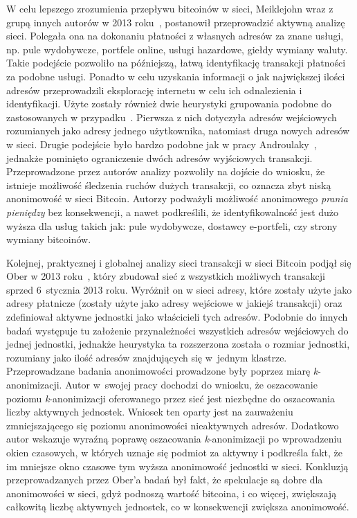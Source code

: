 \documentclass[12pt, oneside, final, openany]{mgr}
\begin{document}
\indent W celu lepszego zrozumienia przepływu bitcoinów w sieci, Meiklejohn wraz z grupą innych autorów w 2013 roku~\cite{meiklejohn2013fistful}, postanowił  przeprowadzić aktywną analizę sieci. Polegała ona na dokonaniu płatności z własnych adresów za znane usługi, np. pule wydobywcze, portfele online, usługi hazardowe, giełdy wymiany waluty. Takie podejście pozwoliło na późniejszą, łatwą identyfikację transakcji płatności za podobne usługi. Ponadto w celu uzyskania informacji o jak największej ilości adresów przeprowadzili eksplorację internetu w celu ich odnalezienia i identyfikacji. Użyte zostały również dwie heurystyki grupowania podobne do zastosowanych w przypadku~\cite{Reid2013, Androulaki2013, Ron2013}. Pierwsza z nich dotyczyła adresów wejściowych rozumianych jako adresy jednego użytkownika, natomiast druga nowych adresów w sieci. Drugie podejście było bardzo podobne jak w pracy Androulaky~\cite{Androulaki2013}, jednakże pominięto ograniczenie dwóch adresów wyjściowych transakcji. Przeprowadzone przez autorów analizy pozwoliły na dojście do wniosku, że istnieje możliwość śledzenia ruchów dużych transakcji, co oznacza zbyt niską anonimowość w sieci Bitcoin. Autorzy podważyli możliwość anonimowego \textit{prania pieniędzy} bez konsekwencji, a nawet podkreślili, że identyfikowalność jest dużo wyższa dla usług takich jak: pule wydobywcze, dostawcy e-portfeli, czy strony wymiany bitcoinów.

\indent Kolejnej, praktycznej i globalnej analizy sieci transakcji w sieci Bitcoin podjął się Ober w 2013 roku~\cite{Ober_2013}, który zbudował sieć z wszystkich możliwych transakcji sprzed 6~stycznia 2013 roku. Wyróżnił on w sieci adresy, które zostały użyte jako adresy płatnicze (zostały użyte jako adresy wejściowe w jakiejś transakcji) oraz zdefiniował aktywne jednostki jako właścicieli tych adresów. Podobnie do innych badań występuje tu założenie przynależności wszystkich adresów wejściowych do jednej jednostki, jednakże heurystyka ta rozszerzona została o rozmiar jednostki, rozumiany jako ilość adresów znajdujących się w~jednym klastrze. Przeprowadzane badania anonimowości prowadzone były poprzez miarę \textit{k}-anonimizacji. Autor w~swojej pracy dochodzi do wniosku, że oszacowanie poziomu \textit{k}-anonimizacji oferowanego przez sieć jest niezbędne do oszacowania liczby aktywnych jednostek. Wniosek ten oparty jest na zauważeniu zmniejszającego się poziomu anonimowości nieaktywnych adresów. Dodatkowo autor wskazuje wyraźną poprawę oszacowania \textit{k}-anonimizacji po wprowadzeniu okien czasowych, w których uznaje się podmiot za aktywny i podkreśla fakt, że im mniejsze okno czasowe tym wyższa anonimowość jednostki w sieci. Konkluzją przeprowadzanych przez Ober'a badań był fakt, że spekulacje są dobre dla anonimowości w sieci, gdyż podnoszą wartość bitcoina, i co więcej, zwiększają całkowitą liczbę aktywnych jednostek, co w konsekwencji zwiększa anonimowość.
\end{document}
